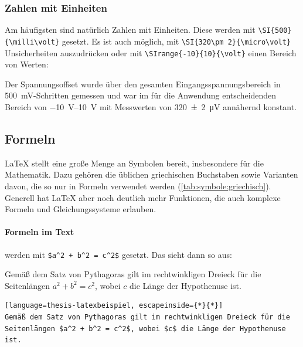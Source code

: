 			\subsubsection{Zahlen mit Einheiten}
				Am häufigsten sind natürlich Zahlen mit Einheiten.
				Diese werden mit \lstinline|\SI{500}{\milli\volt}| gesetzt. Es ist auch möglich, mit \lstinline|\SI{320\pm 2}{\micro\volt}| Unsicherheiten auszudrücken oder mit \lstinline|\SIrange{-10}{10}{\volt}| einen Bereich von Werten:
%				
				\begin{vorlagenbeispiel}
					Der Spannungsoffset wurde über den gesamten Eingangsspannungsbereich in  \SI{500}{\milli\volt}-Schritten gemessen und war im für die Anwendung entscheidenden Bereich von \SIrange{-10}{10}{\volt} mit Messwerten von \SI{320\pm2}{\micro\volt} annähernd konstant.
				\end{vorlagenbeispiel}
		
		\subsection{Formeln}
			\LaTeX{} stellt eine große Menge an Symbolen bereit, insbesondere für die Mathematik.
			Dazu gehören die üblichen griechischen Buchstaben sowie Varianten davon, die so nur in Formeln verwendet werden (\autoref{tab:symbole:griechisch}). 
			Generell hat \LaTeX{} aber noch deutlich mehr Funktionen, die auch komplexe Formeln und Gleichungssysteme erlauben.
			
			\paragraph{Formeln im Text}
				werden mit \lstinline|$a^2 + b^2 = c^2$| gesetzt.
				Das sieht dann so aus:
				\begin{vorlagenbeispiel}
					Gemäß dem Satz von Pythagoras gilt im rechtwinkligen Dreieck für die Seitenlängen $a^2 + b^2 = c^2$, wobei $c$ die Länge der Hypothenuse ist.
				\end{vorlagenbeispiel}
				\begin{lstlisting}[language=thesis-latexbeispiel, escapeinside={*}{*}]
Gemäß dem Satz von Pythagoras gilt im rechtwinkligen Dreieck für die Seitenlängen $a^2 + b^2 = c^2$, wobei $c$ die Länge der Hypothenuse ist.
				\end{lstlisting}
			
